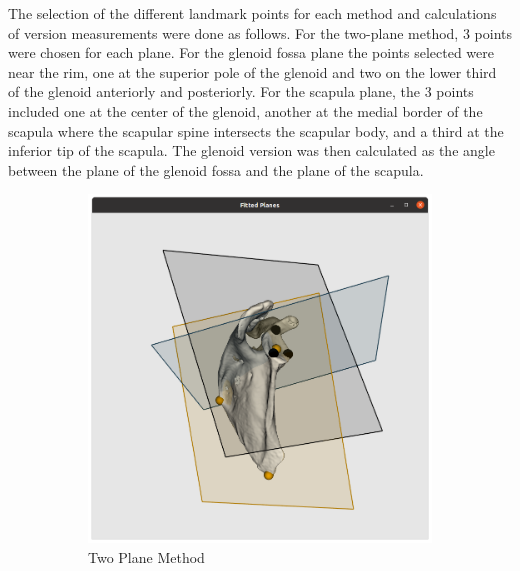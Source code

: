 The selection of the different landmark points for each method and calculations of version measurements were done as follows. For the two-plane method, 3 points were chosen for each plane. For the glenoid fossa plane the points selected were near the rim, one at the superior pole of the glenoid and two on the lower third of the glenoid anteriorly and posteriorly.  For the scapula plane, the 3 points included one at the center of the glenoid, another at the medial border of the scapula where the scapular spine intersects the scapular body, and a third at the inferior tip of the scapula. The glenoid version was then calculated as the angle between the plane of the glenoid fossa and the plane of the scapula. 
\begin{figure}
        \begin{center}
                \begin{subfigure}[b]{0.32\linewidth}
			\includegraphics[width=\linewidth]{figures/planes_vis.png}
			\caption{\label{fig:visplanes}Two Plane Method}
		\end{subfigure}	
                \begin{subfigure}[b]{0.26\linewidth}

\end{subfigure}
\end{center}
\end{figure}

